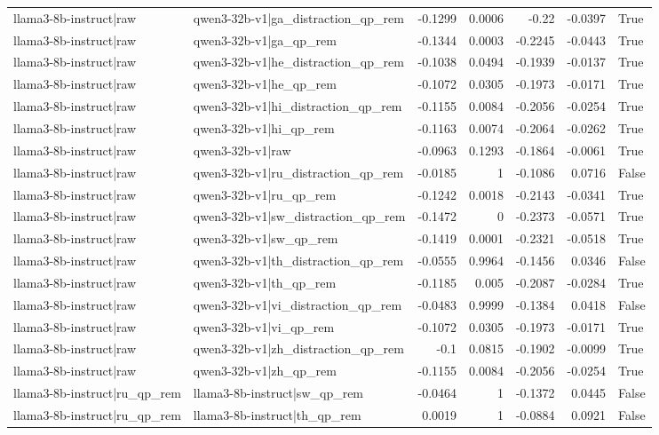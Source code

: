 \begin{table}
\begin{tabular}{l l r r r r l}
llama3-8b-instruct|raw & qwen3-32b-v1|ga_distraction_qp_rem & -0.1299 & 0.0006 & -0.22 & -0.0397 & True \\
llama3-8b-instruct|raw & qwen3-32b-v1|ga_qp_rem & -0.1344 & 0.0003 & -0.2245 & -0.0443 & True \\
llama3-8b-instruct|raw & qwen3-32b-v1|he_distraction_qp_rem & -0.1038 & 0.0494 & -0.1939 & -0.0137 & True \\
llama3-8b-instruct|raw & qwen3-32b-v1|he_qp_rem & -0.1072 & 0.0305 & -0.1973 & -0.0171 & True \\
llama3-8b-instruct|raw & qwen3-32b-v1|hi_distraction_qp_rem & -0.1155 & 0.0084 & -0.2056 & -0.0254 & True \\
llama3-8b-instruct|raw & qwen3-32b-v1|hi_qp_rem & -0.1163 & 0.0074 & -0.2064 & -0.0262 & True \\
llama3-8b-instruct|raw & qwen3-32b-v1|raw & -0.0963 & 0.1293 & -0.1864 & -0.0061 & True \\
llama3-8b-instruct|raw & qwen3-32b-v1|ru_distraction_qp_rem & -0.0185 & 1 & -0.1086 & 0.0716 & False \\
llama3-8b-instruct|raw & qwen3-32b-v1|ru_qp_rem & -0.1242 & 0.0018 & -0.2143 & -0.0341 & True \\
llama3-8b-instruct|raw & qwen3-32b-v1|sw_distraction_qp_rem & -0.1472 & 0 & -0.2373 & -0.0571 & True \\
llama3-8b-instruct|raw & qwen3-32b-v1|sw_qp_rem & -0.1419 & 0.0001 & -0.2321 & -0.0518 & True \\
llama3-8b-instruct|raw & qwen3-32b-v1|th_distraction_qp_rem & -0.0555 & 0.9964 & -0.1456 & 0.0346 & False \\
llama3-8b-instruct|raw & qwen3-32b-v1|th_qp_rem & -0.1185 & 0.005 & -0.2087 & -0.0284 & True \\
llama3-8b-instruct|raw & qwen3-32b-v1|vi_distraction_qp_rem & -0.0483 & 0.9999 & -0.1384 & 0.0418 & False \\
llama3-8b-instruct|raw & qwen3-32b-v1|vi_qp_rem & -0.1072 & 0.0305 & -0.1973 & -0.0171 & True \\
llama3-8b-instruct|raw & qwen3-32b-v1|zh_distraction_qp_rem & -0.1 & 0.0815 & -0.1902 & -0.0099 & True \\
llama3-8b-instruct|raw & qwen3-32b-v1|zh_qp_rem & -0.1155 & 0.0084 & -0.2056 & -0.0254 & True \\
llama3-8b-instruct|ru_qp_rem & llama3-8b-instruct|sw_qp_rem & -0.0464 & 1 & -0.1372 & 0.0445 & False \\
llama3-8b-instruct|ru_qp_rem & llama3-8b-instruct|th_qp_rem & 0.0019 & 1 & -0.0884 & 0.0921 & False \\

\end{tabular}
\end{table}
